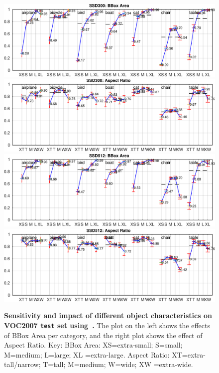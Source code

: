 \documentclass[runningheads]{llncs}
\begin{document}
\begin{figure}[htbp]
	\centering
    \includegraphics[width=0.495\linewidth]{figure/300_plots_area_strong}
    \includegraphics[width=0.495\linewidth]{figure/300_plots_aspect_strong}\\
    \includegraphics[width=0.495\linewidth]{figure/512_plots_area_strong}
    \includegraphics[width=0.495\linewidth]{figure/512_plots_aspect_strong}
    \caption{\textbf{Sensitivity and impact of different object characteristics on VOC2007 \texttt{test} set using~\cite{hoiem2012diagnosing}.} The plot on the left shows the effects of BBox Area per category, and the right plot shows the effect of Aspect Ratio. Key: BBox Area: XS=extra-small; S=small; M=medium; L=large; XL =extra-large. Aspect Ratio: XT=extra-tall/narrow; T=tall; M=medium; W=wide; XW =extra-wide.}
    \label{fig:sensitivityanalysis}
\end{figure}
\end{document}
